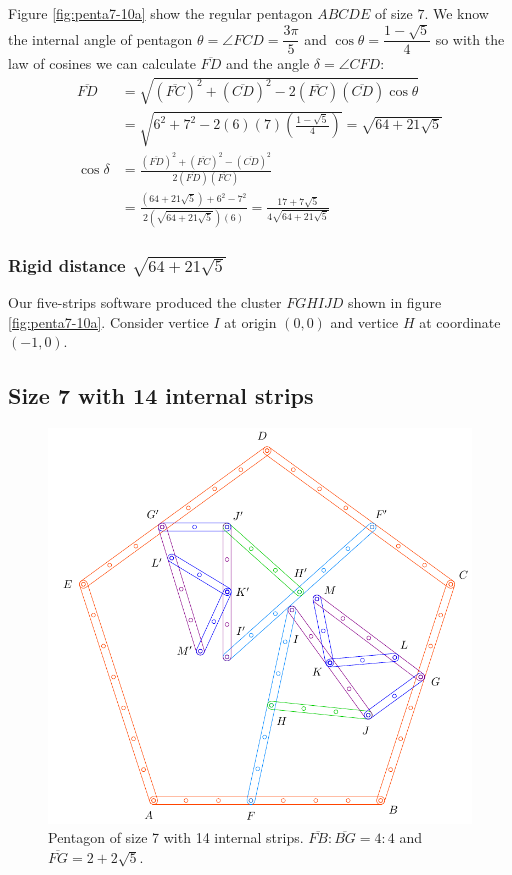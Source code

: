 \documentclass[11pt]{article}
\begin{document}
Figure \ref{fig:penta7-10a} show the regular pentagon $ABCDE$ of size $7$. We know the internal angle of pentagon $\theta=\angle{FCD} =\dfrac{3\pi}5$ and $\cos\theta=\dfrac{1-\sqrt5}4$ so with the law of cosines we can calculate $\overline{FD}$ and the angle $\delta = \angle{CFD}$:
\begin{align}
\overline{FD} &= \sqrt{(\overline{FC})^2 + (\overline{CD})^2
 - 2(\overline{FC})(\overline{CD})\cos\theta} \nonumber\\
 &= \sqrt{6^2 + 7^2 - 2(6)(7)\left(\frac{1-\sqrt5}4\right)} = \sqrt{64 + 21\sqrt5}\\
%
\cos\delta &= \frac{(\overline{FD})^2 + (\overline{FC})^2 - (\overline{CD})^2}
 {2(\overline{FD})(\overline{FC})} \nonumber\\
 &= \frac{\left(64 + 21\sqrt5\right) + 6^2 - 7^2}
  {2\left(\sqrt{64 + 21\sqrt5}\right)(6)}
  = \frac{17 + 7\sqrt5}{4\sqrt{64 + 21\sqrt5}}
\end{align}

\subsubsection{Rigid distance $\sqrt{64 + 21\sqrt5}$}

Our five-strips software produced the cluster $FGHIJD$ shown in figure \ref{fig:penta7-10a}. Consider vertice $I$ at origin $(0,0)$ and vertice $H$ at coordinate $(-1,0)$.

\subsection{Size 7 with 14 internal strips}

\begin{figure}[H]
\centering
\includegraphics[scale=0.8]{7/penta7-14a}
\caption{Pentagon of size 7 with 14 internal strips. $\overline{FB} : \overline{BG} = 4:4$ and $\overline{FG} = 2 + 2\sqrt5$.}
\label{fig:penta7-14a}
\end{figure}
%
\end{document}
